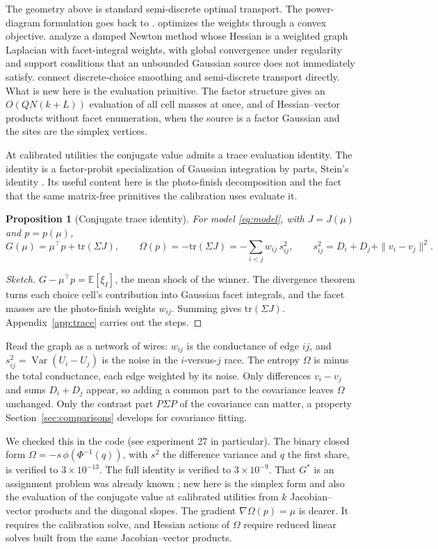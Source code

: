 \documentclass[12pt]{article}
\newtheorem{proposition}{Proposition}
\theoremstyle{remark}
\newcommand{\E}{\mathbb{E}}
\begin{document}
The geometry above is standard semi-discrete optimal transport. The
power-diagram formulation goes back to \citet{aurenhammer1998}.
\citet{levy2015} optimizes the weights through a convex objective.
\citet{kmt2019} analyze a damped Newton method whose Hessian is a
weighted graph Laplacian with facet-integral weights, with global
convergence under regularity and support conditions that an unbounded
Gaussian source does not immediately satisfy. \citet{taskesen2023}
connect discrete-choice smoothing and semi-discrete transport directly.
What is new here is the evaluation primitive. The factor structure gives an
$O(QN(k+L))$ evaluation of all cell masses at once, and of
Hessian--vector products without facet enumeration, when the source is
a factor Gaussian and the sites are the simplex vertices.

At calibrated utilities the conjugate value admits a trace evaluation
identity. The identity is a factor-probit specialization of Gaussian
integration by parts, Stein's identity \citep{stein1981}. Its useful
content here is the photo-finish decomposition and the fact that the
same matrix-free primitives the calibration uses evaluate it.

\begin{proposition}[Conjugate trace identity]\label{prop:trace}
For model \eqref{eq:model}, with $J = J(\mu)$ and $p = p(\mu)$,
\[
G(\mu) = \mu^\top p + \mathrm{tr}(\Sigma J),
\qquad
\Omega(p) = -\mathrm{tr}(\Sigma J)
= -\sum_{i<j} w_{ij}\, s_{ij}^2, \qquad
s_{ij}^2 = D_i + D_j + \|v_i - v_j\|^2 .
\]
\end{proposition}
\begin{proof}[Sketch]
$G - \mu^\top p = \E[\xi_I]$, the mean shock of the winner. The
divergence theorem turns each choice cell's contribution into Gaussian
facet integrals, and the facet masses are the photo-finish weights
$w_{ij}$. Summing gives $\mathrm{tr}(\Sigma J)$.
Appendix~\ref{app:trace} carries out the steps.
\end{proof}
Read the graph
as a network of wires: $w_{ij}$ is the conductance of
edge $ij$, and $s_{ij}^2 = \operatorname{Var}(U_i - U_j)$ is the noise in the
$i$-versus-$j$ race. The entropy $\Omega$ is minus the total
conductance, each edge weighted by its noise. Only differences $v_i -
v_j$ and sums $D_i + D_j$ appear, so adding a common part to the
covariance leaves $\Omega$ unchanged. Only the contrast part
$P\Sigma P$ of the covariance can matter, a property
Section~\ref{sec:comparisons} develops for covariance fitting.

We checked this in the code (see experiment 27 in particular). The
binary closed form $\Omega = -s\,\phi(\Phi^{-1}(q))$, with $s^2$ the
difference variance and $q$ the first share, is verified to
$3\times10^{-13}$. The full identity is verified to $3\times10^{-9}$. That $G^*$ is an assignment problem was already known \citep{chiong2016}; new here is the simplex form and also the
evaluation of the conjugate value
at calibrated utilities from $k$ Jacobian--vector products and the
diagonal slopes. The gradient $\nabla\Omega(p) = \mu$ is dearer. It
requires the calibration solve, and Hessian actions of $\Omega$ require
reduced linear solves built from the same Jacobian--vector products.
\end{document}
